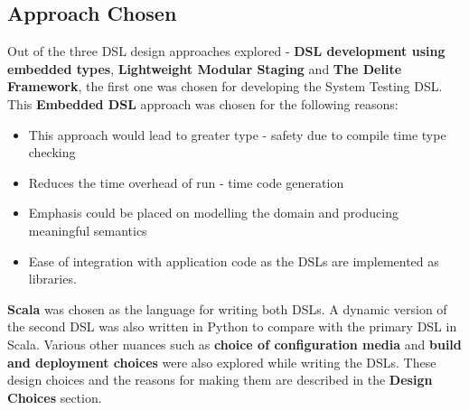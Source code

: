 \subsection{Approach Chosen}
Out of the three DSL design approaches explored - \textbf{DSL development using embedded types}, \textbf{Lightweight Modular Staging} and \textbf{The Delite Framework}, the first one was chosen for developing the System Testing DSL. This \textbf{Embedded DSL} approach was chosen for the following reasons:
\begin{itemize}
\item This approach would lead to greater type - safety due to compile time type checking
\item Reduces the time overhead of run - time code generation
\item Emphasis could be placed on modelling the domain and producing meaningful semantics
\item Ease of integration with application code as the DSLs are implemented as libraries.
\end{itemize}
\bigskip

\noindent
\textbf{Scala} was chosen as the language for writing both DSLs. A dynamic version of the second DSL was also written in Python to compare with the primary DSL in Scala. Various other nuances such as \textbf{choice of configuration media} and \textbf{build and deployment choices} were also explored while writing the DSLs. These design choices and the reasons for making them are described in the \textbf{Design Choices} section.

\newpage

